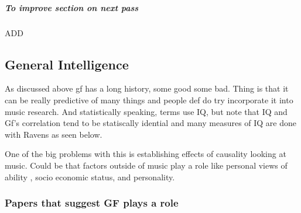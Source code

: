 \documentclass[]{book}
\let\oldsubparagraph\subparagraph
\renewcommand{\subparagraph}[1]{\oldsubparagraph{#1}\mbox{}}
\theoremstyle{definition}
\theoremstyle{definition}
\theoremstyle{definition}
\theoremstyle{remark}
\begin{document}
\hypertarget{to-improve-section-on-next-pass}{%
\subparagraph{To improve section on next
pass}\label{to-improve-section-on-next-pass}}

ADD \citep{hansenWorkingMemoryMusical2013}

\hypertarget{general-intelligence}{%
\subsection{General Intelligence}\label{general-intelligence}}

As discussed above gf has a long history, some good some bad. Thing is
that it can be really predictive of many things and people def do try
incorporate it into music research. And statistically speaking, terms
use IQ, but note that IQ and Gf's correlation tend to be statiscally
idential \citep{kovacsProcessOverlapTheory2016} and many measures of IQ
are done with Ravens as seen below.

One of the big problems with this is establishing effects of causality
looking at music. Could be that factors outside of music play a role
like personal views of ability
\citep{mullensiefenInvestigatingImportanceSelftheories2015} , socio
economic status, and personality.

\hypertarget{papers-that-suggest-gf-plays-a-role}{%
\subsubsection{Papers that suggest GF plays a
role}\label{papers-that-suggest-gf-plays-a-role}}
\end{document}
